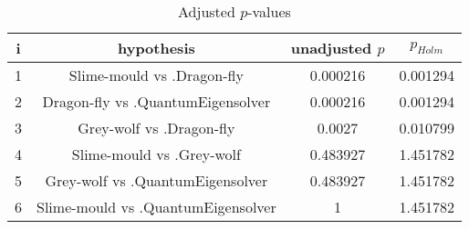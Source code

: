 \documentclass[a4paper,10pt]{article}
\begin{document}
\begin{landscape}
\begin{table}[!htp]
\centering\scriptsize
\begin{tabular}{cccc}
i&hypothesis&unadjusted $p$&$p_{Holm}$\\
\hline1&Slime-mould vs .Dragon-fly&0.000216&0.001294\\
2&Dragon-fly vs .QuantumEigensolver&0.000216&0.001294\\
3&Grey-wolf vs .Dragon-fly&0.0027&0.010799\\
4&Slime-mould vs .Grey-wolf&0.483927&1.451782\\
5&Grey-wolf vs .QuantumEigensolver&0.483927&1.451782\\
6&Slime-mould vs .QuantumEigensolver&1&1.451782\\
\hline
\end{tabular}
\caption{Adjusted $p$-values}
\end{table}

\end{landscape}
\end{document}
